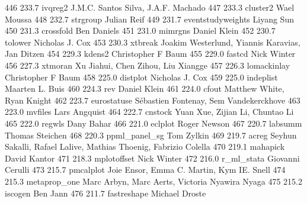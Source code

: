   446    233.7    ivqreg2       J.M.C. Santos Silva, J.A.F. Machado     
   447    233.3    cluster2      Wael Moussa                             
   448    232.7    strgroup      Julian Reif                             
   449    231.7    eventstudyweights  Liyang Sun                              
   450    231.3    crossfold     Ben Daniels                             
   451    231.0    mimrgns       Daniel Klein                            
   452    230.7    tolower       Nicholas J. Cox                         
   453    230.3    xtbreak       Joakim Westerlund, Yiannis Karavias,    
                                   Jan Ditzen                              
   454    229.3    kdens2        Christopher F Baum                      
   455    229.0    fastcd        Nick Winter                             
   456    227.3    xtmoran       Xu Jiahui, Chen  Zihou, Liu Xiangge     
   457    226.3    lomackinlay   Christopher F Baum                      
   458    225.0    distplot      Nicholas J. Cox                         
   459    225.0    indeplist     Maarten L. Buis                         
   460    224.3    rev           Daniel Klein                            
   461    224.0    cfout         Matthew White, Ryan Knight              
   462    223.7    eurostatuse   Sébastien Fontenay, Sem Vandekerckhove 
   463    223.0    mvfiles       Lars Angquist                           
   464    222.7    cnstock       Yuan Xue, Zijian Li, Chuntao Li         
   465    222.0    regwls        Dany Bahar                              
   466    221.0    eclplot       Roger Newson                            
   467    220.7    labsumm       Thomas Steichen                         
   468    220.3    ppml_panel_sg  Tom Zylkin                              
   469    219.7    acreg         Seyhun Sakalli, Rafael Lalive, Mathias  
                                   Thoenig, Fabrizio Colella               
   470    219.1    mahapick      David Kantor                            
   471    218.3    mplotoffset   Nick Winter                             
   472    216.0    r_ml_stata    Giovanni Cerulli                        
   473    215.7    pmcalplot     Joie Ensor, Emma C. Martin, Kym IE.     
                                   Snell                                   
   474    215.3    metaprop_one  Marc Arbyn, Marc Aerts, Victoria        
                                   Nyawira Nyaga                           
   475    215.2    iscogen       Ben Jann                                
   476    211.7    fastreshape   Michael Droste                          
